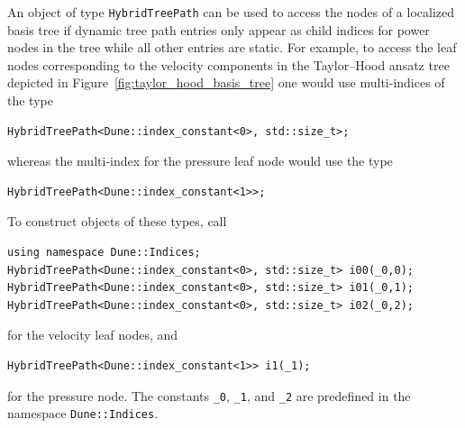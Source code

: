 \documentclass[a4paper,10pt,headings=normal,bibliography=totoc]{scrartcl}
\newcommand{\cpp}[1]{\lstinline[basicstyle=\ttfamily]!#1!}
\begin{document}
An object of type \cpp{HybridTreePath} can be used to access the nodes of a
localized basis tree if dynamic tree path entries only appear as child indices
for power nodes in the tree while all other entries are static.
For example, to access the leaf nodes corresponding
to the velocity components in the Taylor--Hood ansatz tree depicted
in Figure~\ref{fig:taylor_hood_basis_tree} one would use multi-indices
of the type
\begin{lstlisting}[style=Example]
HybridTreePath<Dune::index_constant<0>, std::size_t>;
\end{lstlisting}
whereas the multi-index for the pressure leaf node would use the type
\begin{lstlisting}[style=Example]
HybridTreePath<Dune::index_constant<1>>;
\end{lstlisting}
To construct objects of these types, call
\begin{lstlisting}[style=Example]
using namespace Dune::Indices;
HybridTreePath<Dune::index_constant<0>, std::size_t> i00(_0,0);
HybridTreePath<Dune::index_constant<0>, std::size_t> i01(_0,1);
HybridTreePath<Dune::index_constant<0>, std::size_t> i02(_0,2);
\end{lstlisting}
for the velocity leaf nodes, and
\begin{lstlisting}[style=Example]
HybridTreePath<Dune::index_constant<1>> i1(_1);
\end{lstlisting}
for the pressure node.  The constants \cpp{_0}, \cpp{_1}, and \cpp{_2}
are predefined in the namespace \cpp{Dune::Indices}.
\end{document}
